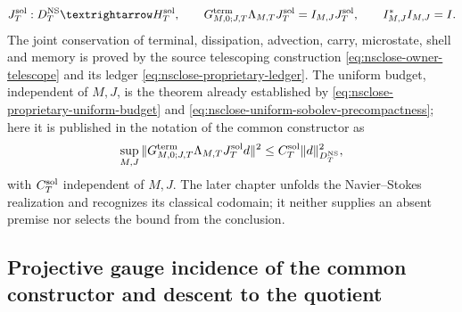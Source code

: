 \begin{equation}\label{eq:pdf2-g-sol-raiz-dato}
 J_T^{\rm sol}:\mathcal D_T^{\rm NS}\longrightarrow\mathcal H_T^{\rm sol},
 \qquad
 \mathbf G_{M,0;J,T}^{\rm term}\Lambda_{M,T}J_T^{\rm sol}
 =I_{M,J}J_T^{\rm sol},
 \qquad I_{M,J}^*I_{M,J}=I.
\end{equation}
The joint conservation of terminal, dissipation, advection, carry, microstate, shell and memory is proved by the source telescoping construction \eqref{eq:nsclose-owner-telescope} and its ledger \eqref{eq:nsclose-proprietary-ledger}. The uniform budget, independent of $M,J$, is the theorem already established by \eqref{eq:nsclose-proprietary-uniform-budget} and \eqref{eq:nsclose-uniform-sobolev-precompactness}; here it is published in the notation of the common constructor as
\begin{equation}\label{eq:pdf2-g-sol-cota-dato}
 \sup_{M,J}
 \|\mathbf G_{M,0;J,T}^{\rm term}\Lambda_{M,T}J_T^{\rm sol}d\|^2
 \le C_T^{\rm sol}\|d\|_{\mathcal D_T^{\rm NS}}^2,
\end{equation}
with $C_T^{\rm sol}$ independent of $M,J$. The later chapter unfolds the Navier--Stokes realization and recognizes its classical codomain; it neither supplies an absent premise nor selects the bound from the conclusion.

\subsection{Projective gauge incidence of the common constructor and descent to the quotient}

